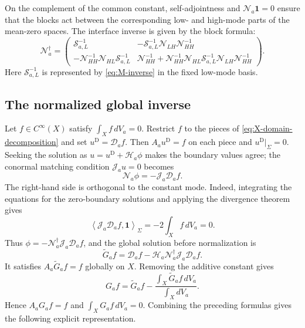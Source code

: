 \documentclass[11pt,a4paper,twoside]{article}
\numberwithin{equation}{section}
\theoremstyle{definition}
\theoremstyle{remark}
\begin{document}
On the complement of the common constant, self-adjointness and
\(\mathcal N_a\mathbf1=0\) ensure that the blocks act between the corresponding low- and high-mode parts of the mean-zero spaces.
 The interface inverse is given by the block formula:
\begin{equation}\label{eq:Na-full-inverse}
\mathcal N_a^\dagger
=
\begin{pmatrix}
\mathcal S_{a,L}^{-1}
&
-\mathcal S_{a,L}^{-1}
\mathcal N_{LH}
\mathcal N_{HH}^{-1}
\\[1mm]
-\mathcal N_{HH}^{-1}
\mathcal N_{HL}
\mathcal S_{a,L}^{-1}
&
\mathcal N_{HH}^{-1}
+
\mathcal N_{HH}^{-1}
\mathcal N_{HL}
\mathcal S_{a,L}^{-1}
\mathcal N_{LH}
\mathcal N_{HH}^{-1}
\end{pmatrix}.
\end{equation}
Here \(\mathcal S_{a,L}^{-1}\) is represented by
\eqref{eq:M-inverse} in the fixed low-mode basis.

\subsection{The normalized global inverse}
\label{subsec:global-Schur}

Let \(f\in C^\infty(X)\) satisfy \(\int_Xf\,dV_a=0\).
Restrict \(f\) to the pieces of \eqref{eq:X-domain-decomposition}
and set \(u^{\mathrm D}=\mathcal D_af\). Then
\(A_au^{\mathrm D}=f\) on each piece and
\(u^{\mathrm D}|_\Sigma=0\). Seeking the solution as
\(u=u^{\mathrm D}+\mathcal H_a\phi\) makes the boundary values agree;
the conormal matching condition \(\mathcal J_au=0\) becomes
\[
\mathcal N_a\phi
=
-\mathcal J_a\mathcal D_af.
\]
The right-hand side is orthogonal to the constant mode.  Indeed,
integrating the equations for the zero-boundary solutions and applying
the divergence theorem gives
\[
\left\langle
\mathcal J_a\mathcal D_af,
\mathbf1
\right\rangle_\Sigma
=
-2\int_Xf\,dV_a
=
0.
\]
Thus \(\phi=-\mathcal N_a^\dagger\mathcal J_a\mathcal D_af\),
and the global solution before normalization is
\begin{equation}\label{eq:Gtilde}
\widetilde G_af
=
\mathcal D_af
-
\mathcal H_a
\mathcal N_a^\dagger
\mathcal J_a
\mathcal D_af.
\end{equation}
It satisfies \(A_a\widetilde G_af=f\) globally on \(X\).
Removing the additive constant gives
\begin{equation}\label{eq:Ga-final}
G_af
=
\widetilde G_af
-
\frac{
\displaystyle
\int_X
\widetilde G_af\,dV_a
}{
\displaystyle
\int_XdV_a
}.
\end{equation}
Hence \(A_aG_af=f\) and \(\int_XG_af\,dV_a=0\).
Combining the preceding formulas gives the following explicit
representation.
\end{document}
